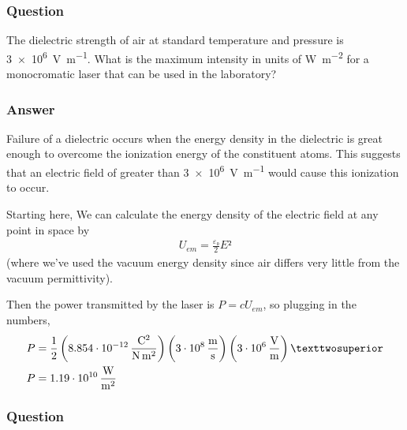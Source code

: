 \subsubsection{Question}

The dielectric strength of air at standard temperature and pressure is
\SI{3e6}{\V\per\m}. What is the maximum intensity in units of \si{\W\per\m^2}
for a monocromatic laser that can be used in the laboratory?

\subsubsection{Answer}
Failure of a dielectric occurs when the energy density in the dielectric is
great enough to overcome the ionization energy of the constituent atoms. This
suggests that an electric field of greater than \SI{3e6}{\V\per\m} would cause
this ionization to occur.

Starting here, We can calculate the energy density of the electric field at any
point in space by
\begin{align*}
	U_{em} = \frac{ε₀}{2}E²
\end{align*}
(where we've used the vacuum energy density since air differs very little from
the vacuum permittivity).

Then the power transmitted by the laser is $P = cU_{em}$, so plugging in the
numbers,
\begin{align*}
	P &= \frac{1}{2}
		\left( \SI[per-mode=fraction]{8.854e-12}
			{\coulomb\squared\per\N\per\m\squared} \right)
		\left( \SI{3e8}{\m\per\s} \vphantom{\frac{V}{V}} \right)
		\left( \SI{3e6}{\V\per\m} \right)² \\
	P &= \SI{1.19e10}{\W\per\m\squared}
\end{align*}

\begin{center}
\end{center}

\subsubsection{Question}

